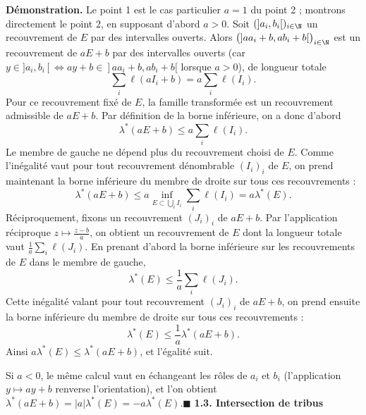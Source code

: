 \textbf{Démonstration.} Le point 1 est le cas particulier $a=1$ du point 2 ; montrons directement le point 2, en supposant d’abord $a>0$. Soit $(]a_i,b_i[)_{i\in\N}$ un recouvrement de $E$ par des intervalles ouverts. Alors $\bigl(]aa_i+b,ab_i+b[\bigr)_{i\in\N}$ est un recouvrement de $aE+b$ par des intervalles ouverts (car $y\in]a_i,b_i[\iff ay+b\in]aa_i+b,ab_i+b[$ lorsque $a>0$), de longueur totale
\[\sum_i\ell(aI_i+b)=a\sum_i\ell(I_i).\]
Pour ce recouvrement fixé de $E$, la famille transformée est un recouvrement admissible de $aE+b$. Par définition de la borne inférieure, on a donc d’abord
\[\lambda^*(aE+b)\le a\sum_i\ell(I_i).\]
Le membre de gauche ne dépend plus du recouvrement choisi de $E$. Comme l’inégalité vaut pour tout recouvrement dénombrable $(I_i)_i$ de $E$, on prend maintenant la borne inférieure du membre de droite sur tous ces recouvrements :
\[\lambda^*(aE+b)\le a\inf_{E\subset\bigcup_i I_i}\sum_i\ell(I_i)=a\lambda^*(E).\]
Réciproquement, fixons un recouvrement $(J_i)_i$ de $aE+b$. Par l’application réciproque $z\mapsto\frac{z-b}{a}$, on obtient un recouvrement de $E$ dont la longueur totale vaut $\frac1a\sum_i\ell(J_i)$. En prenant d’abord la borne inférieure sur les recouvrements de $E$ dans le membre de gauche,
\[\lambda^*(E)\le\frac1a\sum_i\ell(J_i).\]
Cette inégalité valant pour tout recouvrement $(J_i)_i$ de $aE+b$, on prend ensuite la borne inférieure du membre de droite sur tous ces recouvrements :
\[\lambda^*(E)\le\frac1a\lambda^*(aE+b).\]
Ainsi $a\lambda^*(E)\le\lambda^*(aE+b)$, et l’égalité suit.

Si $a<0$, le même calcul vaut en échangeant les rôles de $a_i$ et $b_i$ (l’application $y\mapsto ay+b$ renverse l’orientation), et l’on obtient $\lambda^*(aE+b)=|a|\lambda^*(E)=-a\lambda^*(E)$.\hfill$\blacksquare$
\textbf{1.3. Intersection de tribus}


